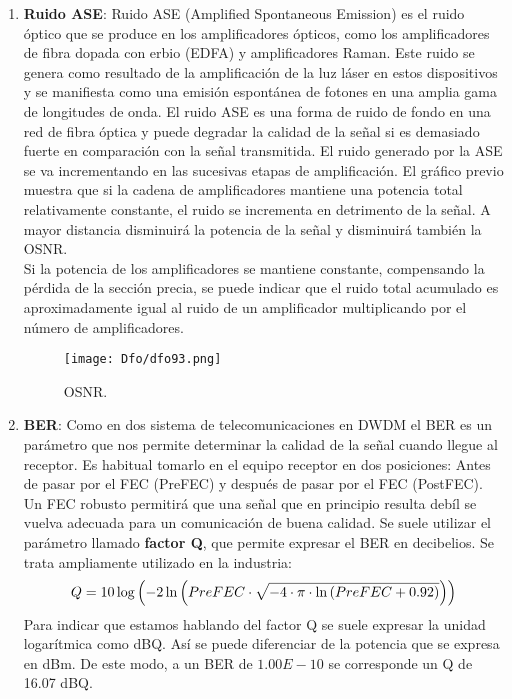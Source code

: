 \documentclass[
	12pt, %
	fleqn, %
	a4paper, %
	oneside, %
]{LegrandOrangeBook}
\begin{document}
\begin{enumerate}
\item \textbf{Ruido ASE}: Ruido ASE (Amplified Spontaneous Emission) es el ruido óptico que se produce en los amplificadores ópticos, como los amplificadores de fibra dopada con erbio (EDFA) y amplificadores Raman. Este ruido se genera como resultado de la amplificación de la luz láser en estos dispositivos y se manifiesta como una emisión espontánea de fotones en una amplia gama de longitudes de onda. El ruido ASE es una forma de ruido de fondo en una red de fibra óptica y puede degradar la calidad de la señal si es demasiado fuerte en comparación con la señal transmitida. El ruido generado por la ASE se va incrementando en las sucesivas etapas de amplificación. El gráfico previo muestra que si la cadena de amplificadores mantiene una potencia total relativamente constante, el ruido se incrementa en detrimento de la señal. A mayor distancia disminuirá la potencia de la señal y disminuirá también la OSNR.\\Si la potencia de los amplificadores se mantiene constante, compensando la pérdida de la sección precia, se puede indicar que el ruido total acumulado es aproximadamente igual al ruido de un amplificador multiplicando por el número de amplificadores.
\begin{figure}[H]
\centering
\texttt{[image: Dfo/dfo93.png]}
\caption{OSNR.}
\end{figure}
\item \textbf{BER}: Como en dos sistema de telecomunicaciones en DWDM el BER es un parámetro que nos permite determinar la calidad de la señal cuando llegue al receptor. Es habitual tomarlo en el equipo receptor en dos posiciones: Antes de pasar por el FEC (PreFEC) y después de pasar por el FEC (PostFEC). Un FEC robusto permitirá que una señal que en principio resulta debíl se vuelva adecuada para un comunicación de buena calidad. Se suele utilizar el parámetro llamado \textbf{factor Q}, que permite expresar el BER en decibelios. Se trata ampliamente utilizado en la industria:
\begin{equation}
Q=10\log\left(-2\ln\left(PreFEC\cdot\sqrt{-4\cdot \pi\cdot \ln\left(PreFEC+0.92\right)}\right)\right)
\end{equation}
Para indicar que estamos hablando del factor Q se suele expresar la unidad logarítmica como dBQ. Así se puede diferenciar de la potencia que se expresa en dBm. De este modo, a un BER de $1.00E-10$ se corresponde un Q de 16.07 dBQ.
\begin{center}
\begin{tabular}{|c|c|}

\end{tabular}
\end{center}
\end{enumerate}
\end{document}
